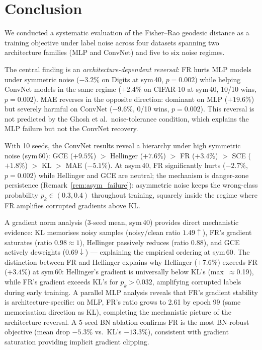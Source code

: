 \documentclass[11pt]{article}
\begin{document}
\section{Conclusion}

We conducted a systematic evaluation of the Fisher--Rao geodesic distance as a
training objective under label noise across four datasets spanning two
architecture families (MLP and ConvNet) and five to six noise regimes.

The central finding is an \emph{architecture-dependent reversal}: FR hurts MLP
models under symmetric noise ($-3.2\%$ on Digits at sym\,40, $p=0.002$) while
helping ConvNet models in the same regime ($+2.4\%$ on CIFAR-10 at sym\,40,
10/10 wins, $p=0.002$).
MAE reverses in the opposite direction: dominant on MLP ($+19.6\%$) but
severely harmful on ConvNet ($-9.6\%$, 0/10 wins, $p=0.002$).
This reversal is not predicted by the Ghosh et al.\ noise-tolerance condition,
which explains the MLP failure but not the ConvNet recovery.

With 10 seeds, the ConvNet results reveal a hierarchy under high symmetric noise
(sym\,60): GCE ($+9.5\%$) $>$ Hellinger ($+7.6\%$) $>$ FR ($+3.4\%$) $>$ SCE
($+1.8\%$) $>$ KL $>$ MAE ($-5.1\%$).
At asym\,40, FR significantly hurts ($-2.7\%$, $p=0.002$) while Hellinger and
GCE are neutral; the mechanism is danger-zone persistence (Remark~\ref{rem:asym_failure}):
asymmetric noise keeps the wrong-class probability $p_k\in(0.3,0.4)$ throughout
training, squarely inside the regime where FR amplifies corrupted gradients above KL.

A gradient norm analysis (3-seed mean, sym\,40) provides direct mechanistic evidence:
KL memorises noisy samples (noisy/clean ratio $1.49\uparrow$), FR's gradient saturates
(ratio $0.98\approx 1$), Hellinger passively reduces (ratio $0.88$), and GCE actively
deweights ($0.69\downarrow$) — explaining the empirical ordering at sym\,60.
The distinction between FR and Hellinger explains why Hellinger ($+7.6\%$) exceeds
FR ($+3.4\%$) at sym\,60: Hellinger's gradient is universally below KL's
(max~$\approx$0.19), while FR's gradient exceeds KL's for $p_k > 0.032$,
amplifying corrupted labels during early training.
A parallel MLP analysis reveals that FR's gradient stability is architecture-specific:
on MLP, FR's ratio grows to 2.61 by epoch 99 (same memorisation direction as KL),
completing the mechanistic picture of the architecture reversal.
A 5-seed BN ablation confirms FR is the most BN-robust objective (mean drop
$-5.3\%$ vs.\ KL's $-13.3\%$), consistent with gradient saturation providing
implicit gradient clipping.
\end{document}
